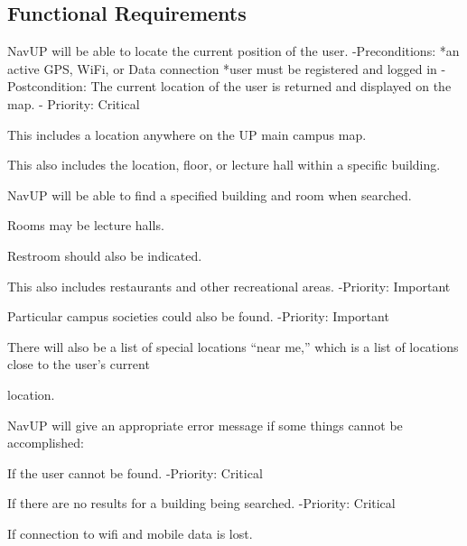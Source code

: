 \documentclass[12pt,a4paper]{article}
\begin{document}
\begin{RequirementsEnum}
    \subsection{Functional Requirements}
\item NavUP will be able to locate the current position of the user.\newline
    -Preconditions:\newline
        *an active GPS, WiFi, or Data connection\newline
        *user must be registered and logged in \newline
    -Postcondition: The current location of the user is returned and displayed on the map.\newline
    - Priority: Critical
    \begin{RequirementsEnum}
   	 	\item This includes a location anywhere on the UP main campus map.
   		\item This also includes the location, floor, or lecture hall within a specific building.
    \end{RequirementsEnum}
\item NavUP will be able to find a specified building and room when searched.
	\begin{RequirementsEnum}
    	\item Rooms may be lecture halls.
	    \item Restroom should also be indicated.
	    \item This also includes restaurants and other recreational areas.\newline
        	-Priority: Important
    	\item Particular campus societies could also be found.\newline
        	-Priority: Important
    	\item There will also be a list of special locations “near me,” which is a list of locations close to the user’s current
    \end{RequirementsEnum} location.
\item NavUP will give an appropriate error message if some things cannot be accomplished:
	\begin{RequirementsEnum}
 	   	\item If the user cannot be found.
        -Priority: Critical
    	\item If there are no results for a building being searched.
        -Priority: Critical
		\item If connection to wifi and mobile data is lost.

\end{RequirementsEnum}
\end{RequirementsEnum}
\end{document}
